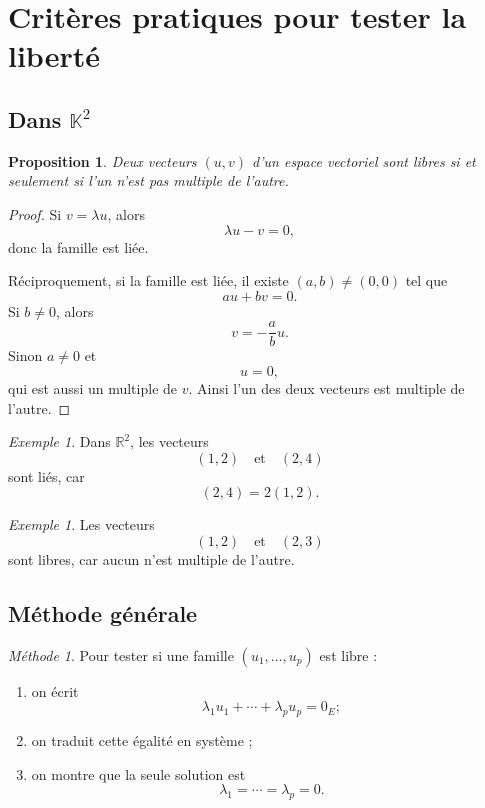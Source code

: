 \documentclass[11pt,a4paper]{article}
\newtheorem{proposition}[definition]{Proposition}
\theoremstyle{remark}
\newtheorem{exemple}[definition]{Exemple}
\newtheorem*{methode}{Méthode}
\newcommand{\R}{\mathbb{R}}
\newcommand{\K}{\mathbb{K}}
\begin{document}
\section{Critères pratiques pour tester la liberté}

\subsection{Dans \(\K^2\)}

\begin{proposition}
Deux vecteurs \((u,v)\) d’un espace vectoriel sont libres si et seulement si l’un n’est pas multiple de l’autre.
\end{proposition}

\begin{proof}
Si \(v=\lambda u\), alors
\[
\lambda u-v=0,
\]
donc la famille est liée.

Réciproquement, si la famille est liée, il existe \((a,b)\neq (0,0)\) tel que
\[
au+bv=0.
\]
Si \(b\neq 0\), alors
\[
v=-\frac{a}{b}u.
\]
Sinon \(a\neq 0\) et
\[
u=0,
\]
qui est aussi un multiple de \(v\). Ainsi l’un des deux vecteurs est multiple de l’autre.
\end{proof}

\begin{exemple}
Dans \(\R^2\), les vecteurs
\[
(1,2)\quad \text{et} \quad (2,4)
\]
sont liés, car
\[
(2,4)=2(1,2).
\]
\end{exemple}

\begin{exemple}
Les vecteurs
\[
(1,2)\quad \text{et} \quad (2,3)
\]
sont libres, car aucun n’est multiple de l’autre.
\end{exemple}

\subsection{Méthode générale}

\begin{methode}
Pour tester si une famille \((u_1,\dots,u_p)\) est libre :
\begin{enumerate}
    \item on écrit
    \[
    \lambda_1u_1+\cdots+\lambda_pu_p=0_E ;
    \]
    \item on traduit cette égalité en système ;
    \item on montre que la seule solution est
    \[
    \lambda_1=\cdots=\lambda_p=0.
    \]
\end{enumerate}
\end{methode}
\end{document}
